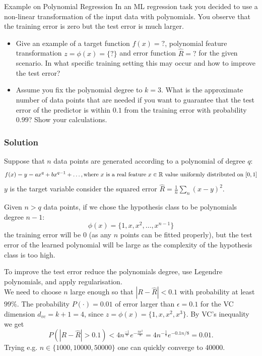 \begin{examplebox}{Example on Polynomial Regression}
In an ML regression task you decided to use a non-linear transformation of the input data with polynomials. You observe that the training error is zero but the test error is much larger.

\begin{itemize}
    \item Give an example of a target function $f(x) = ?$, polynomial feature transformation $z = \phi(x) = \{?\} $ and error function $\hat{R} = ? $ for the given scenario. In what specific training setting this may occur and how to improve the test error?
    \item Assume you fix the polynomial degree to $k = 3$. What is the approximate number of data points that are needed if you want to guarantee that the test error of the predictor is within $0.1$ from the training error with probability $0.99$? Show your calculations.
\end{itemize}

\subsubsection*{Solution}
Suppose that $n$ data points are generated according to a polynomial of degree $q$:
\[
f(x) = y = ax^q + bx^{q-1} + \ldots, \\
\text{where } x \text{ is a real feature } x \in \mathbb{R} \text{ value uniformly distributed on } [0,1]
\]
$y$ is the target variable consider the squared error $\hat{R} = \frac{1}{n} \sum_{n}(x - y)^2$.

Given $n > q$ data points, if we chose the hypothesis class to be polynomials degree $n - 1$:
\[
\phi(x) = \{1, x, x^2, \ldots, x^{n-1}\}
\]
the training error will be $0$ (as any $n$ points can be fitted properly), but the test error of the learned polynomial will be large as the complexity of the hypothesis class is too high.

To improve the test error reduce the polynomials degree, use Legendre polynomials, and apply regularisation.\\

We need to choose $n$ large enough so that $|R - \hat{R}| < 0.1$ with probability at least $99\%$.
The probability $P(\cdot) = 0.01$ of error larger than $\epsilon = 0.1$ for the VC dimension $d_{vc} = k + 1 = 4$, since $z = \phi(x) = \{1, x, x^2, x^3\}$.
By VC's inequality we get
\[
P(|R - \hat{R}| > 0.1) < 4n^{\frac{-1}{8}}e^{-\frac{n\epsilon^2}{8}} = 4n^{-\frac{1}{8}}e^{-0.1n/8} = 0.01.
\]
Trying e.g. $n \in \{1000, 10000, 50000\}$ one can quickly converge to 40000.
\end{examplebox}

